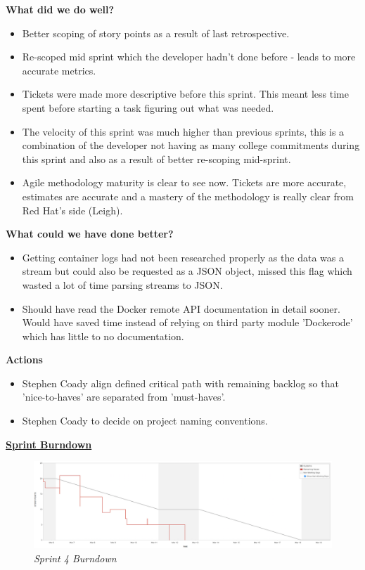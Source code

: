 \textbf{What did we do well?}
\begin{itemize}
	\item Better scoping of story points as a result of last retrospective.
	\item Re-scoped mid sprint which the developer hadn't done before - leads to more accurate metrics.
	\item Tickets were made more descriptive before this sprint. This meant less time spent before starting a task figuring out what was needed.
	\item The velocity of this sprint was much higher than previous sprints, this is a combination of the developer not having as many college commitments during this sprint and also as a result of better re-scoping mid-sprint.
	\item Agile methodology maturity is clear to see now. Tickets are more accurate, estimates are accurate and a mastery of the methodology is really clear from Red Hat's side (Leigh).
\end{itemize}
\textbf{What could we have done better?}
\begin{itemize}
	\item Getting container logs had not been researched properly as the data was a stream but could also be requested as a JSON object, missed this flag which wasted a lot of time parsing streams to JSON.
	\item Should have read the Docker remote API documentation in detail sooner. Would have saved time instead of relying on third party module 'Dockerode' which has little to no documentation.
\end{itemize}

\textbf{Actions}
\begin{itemize}
	\item Stephen Coady align defined critical path with remaining backlog so that 'nice-to-haves' are separated from 'must-haves'.
	\item Stephen Coady to decide on project naming conventions.
\end{itemize}

\underline{\textbf{Sprint Burndown}}\newline
\begin{figure}[!ht]
\centering
\includegraphics*[width=\textwidth]{images/sprint4}
\caption{\em Sprint 4 Burndown}
\label{fig:sprint4}
\end{figure}

